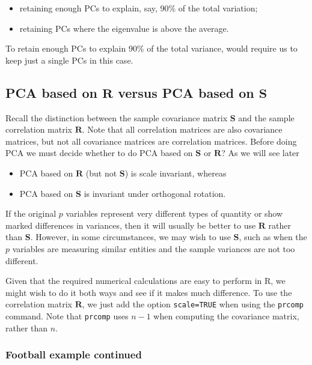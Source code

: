 \documentclass[
]{book}
\providecommand{\tightlist}{%
  \setlength{\itemsep}{0pt}\setlength{\parskip}{0pt}}
\theoremstyle{definition}
\theoremstyle{definition}
\theoremstyle{definition}
\theoremstyle{definition}
\theoremstyle{remark}
\begin{document}
\begin{itemize}
\tightlist
\item
  retaining enough PCs to explain, say, 90\% of the total variation;
\item
  retaining PCs where the eigenvalue is above the average.
\end{itemize}

To retain enough PCs to explain 90\% of the total variance, would require us to keep just a single PCs in this case.

\subsection{\texorpdfstring{PCA based on \(\mathbf R\) versus PCA based on \(\mathbf S\)}{PCA based on \textbackslash mathbf R versus PCA based on \textbackslash mathbf S}}\label{pcawithR}

Recall the distinction between the sample covariance matrix \(\mathbf S\) and the sample correlation matrix \(\mathbf R\).
Note that all correlation matrices are also covariance matrices, but not all covariance matrices are correlation matrices.
Before doing PCA we must decide whether to do PCA based on \(\mathbf S\) or \(\mathbf R\)? As we will see later

\begin{itemize}
\tightlist
\item
  PCA based on \(\mathbf R\) (but not \(\mathbf S\)) is scale invariant, whereas
\item
  PCA based on \(\mathbf S\) is invariant under orthogonal rotation.
\end{itemize}

If the original \(p\) variables represent very different types of quantity or show marked differences in variances, then it will usually be better to use \(\mathbf R\) rather than \(\mathbf S\). However, in some circumstances, we may wish to use \(\mathbf S\), such as when the \(p\) variables are measuring similar entities and the sample variances are not too different.

Given that the required numerical calculations are easy to perform in R, we might wish to do it both ways and see if it makes much difference. To use the correlation matrix \(\mathbf R\), we just add the option \texttt{scale=TRUE} when using the \texttt{prcomp} command. Note that \texttt{prcomp} uses \(n-1\) when computing the covariance matrix, rather than \(n\).

\subsubsection{Football example continued}\label{football-example-continued}
\end{document}
